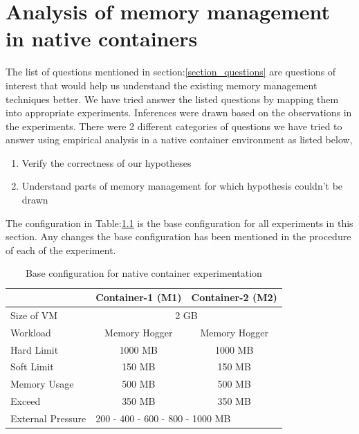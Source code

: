 
\chapter{Analysis of memory management in native containers}

  The list of questions mentioned in section:\ref{section_questions} are questions of interest that would help us understand the existing 
memory management techniques better. We have tried answer the listed questions by mapping them into appropriate experiments. Inferences 
were drawn based on the observations in the experiments. There were 2 different categories of questions we have tried to answer using 
empirical analysis in a native container environment as listed below,
  
  \begin{enumerate}
    \item Verify the correctness of our hypotheses
    \item Understand parts of memory management for which hypothesis couldn't be drawn
  \end{enumerate}
  
  The configuration in Table:\ref{table_native_base} is the base configuration for all experiments in this section. Any changes the base 
configuration has been mentioned in the procedure of each of the experiment.

    \begin{table}	 
      \begin{center}
	\begin{tabular}{ l | c | c }
	  & Container-1 (M1) & Container-2 (M2) \\ 
	  \hline
	  \hline
	  Size of VM & \multicolumn{2}{c}{2 GB} \\	      
	  \hline
	  Workload & Memory Hogger & Memory Hogger \\
	  \hline
	  Hard Limit & 1000 MB & 1000 MB \\  
	  \hline
	  Soft Limit & 150 MB & 150 MB \\  
	  \hline
	  Memory Usage & 500 MB & 500 MB \\
	  \hline
	  Exceed & 350 MB & 350 MB \\
	  \hline 
	  External Pressure & \multicolumn{2}{l}{ 200 - 400 - 600 - 800 - 1000 MB} \\
	\end{tabular}	    
	\caption{Base configuration for native container experimentation}
	\label{table_native_base}
      \end{center}
    \end{table}
    
